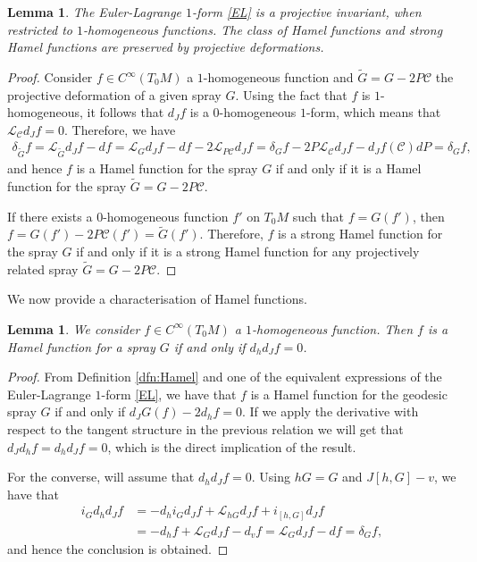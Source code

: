\documentclass[oneside,english]{amsart}
\theoremstyle{definition}
\theoremstyle{plain}
\newtheorem{lem}[theorem]{Lemma}
\theoremstyle{plain}
\theoremstyle{plain}
\theoremstyle{remark}
\theoremstyle{remark}
\theoremstyle{remark}
\begin{document}
\begin{lem} \label{lemma:Hproj_inv}
The Euler-Lagrange $1$-form \eqref{EL} is a projective invariant, when restricted to $1$-homogeneous functions. The class of Hamel functions and strong Hamel functions are preserved by projective deformations. 
\end{lem}
\begin{proof}
Consider $f\in C^{\infty}(T_0M)$ a $1$-homogeneous function and $\widetilde{G}=G-2P\mathcal{C}$ the projective deformation of a given spray $G$. Using the fact that $f$ is $1$-homogeneous, it follows that $d_Jf$ is a $0$-homogeneous $1$-form, which means that $\mathcal{L}_{\mathcal{C}}d_Jf=0$. Therefore, we have
\begin{eqnarray*}
\delta_{\widetilde{G}}f=\mathcal{L}_{\widetilde{G}}d_Jf-df = \mathcal{L}_{G}d_Jf-df - 2\mathcal{L}_{P\mathcal{C}}d_Jf = \delta_Gf - 2 P \mathcal{L}_{\mathcal{C}}d_Jf - d_Jf(\mathcal{C})dP=\delta_Gf,
\end{eqnarray*}
and hence $f$ is a Hamel function for the spray $G$ if and only if it is a Hamel function for the spray $\widetilde{G}=G-2P\mathcal{C}$.

If there exists a $0$-homogeneous function $f'$ on $T_0M$ such that $f=G(f')$, then $f=G(f')-2P\mathcal{C}(f')=\widetilde{G}(f')$. Therefore, $f$ is a strong Hamel function for the spray $G$ if and only if it is a strong Hamel function for any projectively related spray $\widetilde{G}=G-2P\mathcal{C}$. 
\end{proof}

We now provide a characterisation of Hamel functions.
\begin{lem}\label{djdhf}
We consider $f\in C^\infty(T_0M)$  a $1$-homogeneous function. Then $f$ is a Hamel function for a spray $G$ if and only if $d_hd_Jf=0$.
\end{lem}
\begin{proof}
From Definition \ref{dfn:Hamel} and one of the equivalent expressions of the Euler-Lagrange $1$-form \eqref{EL}, we have that $f$ is a Hamel function for the geodesic spray $G$ if and  only if $d_JG(f)-2d_hf=0$. If we apply the derivative with respect to the tangent structure in the previous relation we will get that $d_Jd_hf=d_hd_Jf=0$, which is the direct implication of the result.

For the converse, will assume that $d_hd_Jf=0$. Using $hG=G$ and $J[h,G]-v$, we have that
\begin{equation*}
\begin{aligned}
i_Gd_hd_Jf&=-d_hi_Gd_Jf+\mathcal{L}_{hG}d_Jf+i_{[h,G]}d_Jf\\&=-d_hf+\mathcal{L}_{G}d_Jf-d_vf = \mathcal{L}_Gd_Jf-df=\delta_Gf,
\end{aligned}
\end{equation*} 
and hence the conclusion is obtained.
\end{proof}
\end{document}
